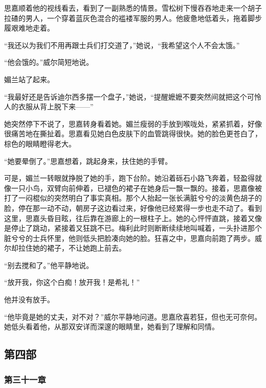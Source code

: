 \par 思嘉顺着他的视线看去，看到了一副熟悉的情景。雪松树下慢吞吞地走来一个胡子拉碴的男人，一个穿着蓝灰色混合的褴褛军服的男人。他疲惫地低着头，拖着脚步履艰难地走着。
\par “我还以为我们不用再跟士兵们打交道了，”她说，“我希望这个人不会太饿。”
\par “他会饿的。”威尔简短地说。
\par 媚兰站了起来。
\par “我最好还是告诉迪尔西多摆一个盘子，”她说，“提醒嬷嬷不要突然间就把这个可怜人的衣服从背上脱下来——”
\par 她突然停下不说了，思嘉转身看着她。媚兰瘦弱的手放到喉咙处，紧紧抓着，好像很痛苦地在撕扯着。思嘉看见她白色皮肤下的血管跳得很快。她的脸色更苍白了，棕色的眼睛瞪得老大。
\par “她要晕倒了。”思嘉想着，跳起身来，扶住她的手臂。
\par 可是，媚兰一转眼就挣脱了她的手，跑下台阶。她沿着砾石小路飞奔着，轻盈得就像一只小鸟，双臂向前伸着，已褪色的裙子在她身后一飘一飘的。接着，思嘉像被打了一闷棍似的突然明白了事实真相。那个人抬起一张长满脏兮兮的淡黄色胡子的脸，停在那一动不动，朝房子这边看过来，好像他已经累得一步也走不动了。看到这里，思嘉头昏目眩，往后靠在游廊上的一根柱子上。她的心怦怦直跳，接着又像是停止了跳动，紧接着又狂跳不已。梅利此时则断断续续地叫喊着，一头扑进那个脏兮兮的士兵怀里，他则低头把脸凑向她的脸。狂喜之中，思嘉向前跑了两步。威尔却拉住她的裙子，不让她跑上前去。
\par “别去搅和了。”他平静地说。
\par “放开我，你这个白痴！放开我！是希礼！”
\par 他并没有放手。
\par “他毕竟是她的丈夫，对不对？”威尔平静地问道。思嘉欣喜若狂，但也无可奈何。她低头看着他，从那双安详而深邃的眼睛里，她看到了理解和同情。

\subsection{第四部}



\subsubsection{第三十一章}

